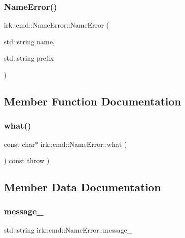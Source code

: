 \subsubsection{\texorpdfstring{Name\+Error()}{NameError()}}
{\footnotesize\ttfamily irk\+::cmd\+::\+Name\+Error\+::\+Name\+Error (\begin{DoxyParamCaption}\item[{std\+::string}]{name,  }\item[{std\+::string}]{prefix }\end{DoxyParamCaption})\hspace{0.3cm}{\ttfamily [inline]}}



\subsection{Member Function Documentation}
\mbox{\label{classirk_1_1cmd_1_1NameError_a4b40b1eb98ba9013a64aa3217482fe42}} 
\subsubsection{\texorpdfstring{what()}{what()}}
{\footnotesize\ttfamily const char$\ast$ irk\+::cmd\+::\+Name\+Error\+::what (\begin{DoxyParamCaption}{ }\end{DoxyParamCaption}) const throw  ) \hspace{0.3cm}{\ttfamily [inline]}}



\subsection{Member Data Documentation}
\mbox{\label{classirk_1_1cmd_1_1NameError_ade50aeda2753957400b17a9a5127e744}} 
\subsubsection{\texorpdfstring{message\+\_\+}{message\_}}
{\footnotesize\ttfamily std\+::string irk\+::cmd\+::\+Name\+Error\+::message\+\_\+\hspace{0.3cm}{\ttfamily [protected]}}

